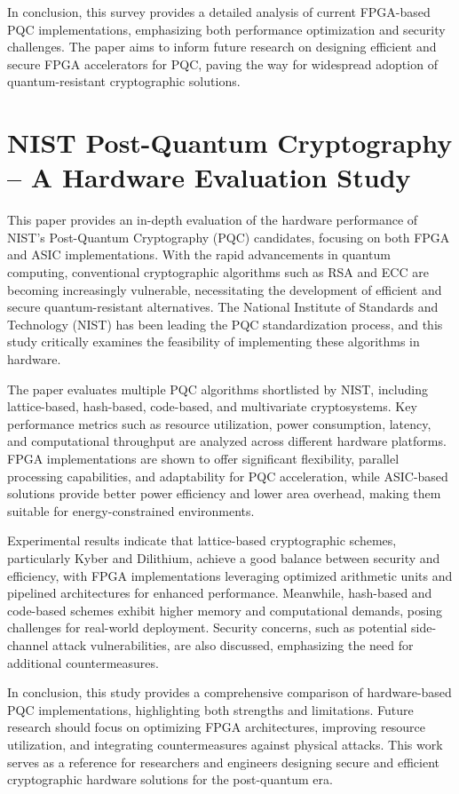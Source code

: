 \documentclass[a4paper, 12pt]{report}
\begin{document}
	In conclusion, this survey provides a detailed analysis of current FPGA-based PQC implementations, emphasizing both performance optimization and security challenges. The paper aims to inform future research on designing efficient and secure FPGA accelerators for PQC, paving the way for widespread adoption of quantum-resistant cryptographic solutions.
	
	\section{NIST Post-Quantum Cryptography – A Hardware Evaluation Study \cite{paper_2}}
	This paper provides an in-depth evaluation of the hardware performance of NIST’s Post-Quantum Cryptography (PQC) candidates, focusing on both FPGA and ASIC implementations. With the rapid advancements in quantum computing, conventional cryptographic algorithms such as RSA and ECC are becoming increasingly vulnerable, necessitating the development of efficient and secure quantum-resistant alternatives. The National Institute of Standards and Technology (NIST) has been leading the PQC standardization process, and this study critically examines the feasibility of implementing these algorithms in hardware.
	
	The paper evaluates multiple PQC algorithms shortlisted by NIST, including lattice-based, hash-based, code-based, and multivariate cryptosystems. Key performance metrics such as resource utilization, power consumption, latency, and computational throughput are analyzed across different hardware platforms. FPGA implementations are shown to offer significant flexibility, parallel processing capabilities, and adaptability for PQC acceleration, while ASIC-based solutions provide better power efficiency and lower area overhead, making them suitable for energy-constrained environments.
	
	Experimental results indicate that lattice-based cryptographic schemes, particularly Kyber and Dilithium, achieve a good balance between security and efficiency, with FPGA implementations leveraging optimized arithmetic units and pipelined architectures for enhanced performance. Meanwhile, hash-based and code-based schemes exhibit higher memory and computational demands, posing challenges for real-world deployment. Security concerns, such as potential side-channel attack vulnerabilities, are also discussed, emphasizing the need for additional countermeasures.
	
	In conclusion, this study provides a comprehensive comparison of hardware-based PQC implementations, highlighting both strengths and limitations. Future research should focus on optimizing FPGA architectures, improving resource utilization, and integrating countermeasures against physical attacks. This work serves as a reference for researchers and engineers designing secure and efficient cryptographic hardware solutions for the post-quantum era.
	
	\newpage
	
	
\end{document}
